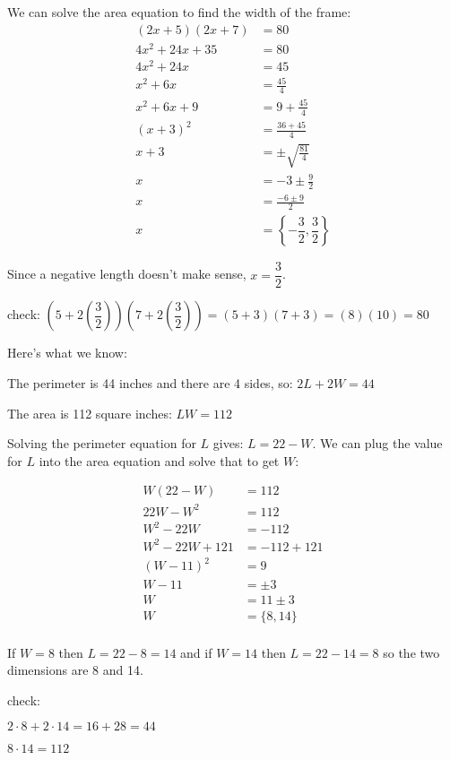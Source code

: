 \documentclass[fleqn,addpoints]{exam}
\begin{document}
\begin{description}
We can solve the area equation to find the width of the frame:
\begin{align*}
  (2x+5)(2x+7) &= 80 \\
  4x^2 + 24x + 35 &= 80 \\
  4x^2 + 24x &= 45 \\
  x^2 + 6x &= \frac{45}{4} \\
  x^2 + 6x +9 &= 9 + \frac{45}{4} \\
  (x+3)^2 &=  \frac{36+45}{4} \\
  x+3 &=  \pm \sqrt{\frac{81}{4}} \\
  x &= -3 \pm \frac{9}{2} \\
  x &= \frac{-6 \pm 9}{2} \\
  x &= \left \{ - \dfrac{3}{2}, \dfrac{3}{2} \right \}
\end{align*}

Since a negative length doesn't make sense, $x = \dfrac{3}{2}$.

check: \( \left( 5 + 2\left( \dfrac{3}{2} \right) \right) \left(7 + 2\left( \dfrac{3}{2} \right) \right) = (5+3)(7+3) = (8)(10) = 80 \)

\item[53]
Here's what we know:
\begin{itemize*}
  \item The perimeter is 44 inches and there are 4 sides, so: $2L + 2W = 44$
  \item The area is 112 square inches: $LW = 112$
\end{itemize*}

Solving the perimeter equation for $L$ gives: $L = 22-W$.  We can plug the value for $L$ into the area equation and
solve that to get $W$:

\begin{align*}
  W(22-W) &= 112 \\
  22W -W^2 &= 112 \\
  W^2 - 22W &= -112 \\
  W^2 - 22W + 121 &= -112 + 121 \\
  (W-11)^2 &= 9 \\
  W-11 &= \pm 3 \\
  W &= 11 \pm 3 \\
  W &= \{8, 14\} \\ 
\end{align*}

If $W = 8$ then $L = 22 - 8 = 14$ and if $W=14$ then $L = 22-14 = 8$ so the two dimensions are 8 and 14.

check:
\begin{itemize*}
  \item $2 \cdot 8 + 2 \cdot 14 = 16 + 28 = 44$
  \item $8 \cdot 14 = 112$
\end{itemize*}


\end{description}
\end{document}
